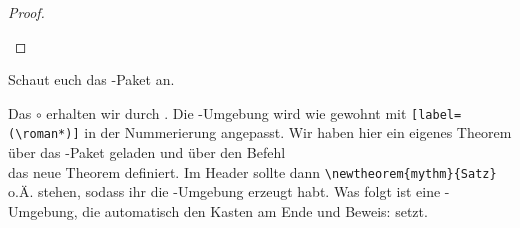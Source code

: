 \begin{enumerate}
\begin{mathespecial}
\begin{proof}
\begin{enumerate}[label=(\roman*)]
                \end{enumerate}
                \end{proof}
                \begin{hinweis}
                    Schaut euch das -Paket an.
                \end{hinweis}
            \begin{loesung}
                Das $\circ$ erhalten wir durch . Die -Umgebung
                wird wie gewohnt mit \verb|[label=(\roman*)]| in der Nummerierung
                angepasst. Wir haben hier ein eigenes Theorem über das
                -Paket geladen und über den Befehl\\
                das neue Theorem definiert. Im Header sollte dann 
                \verb|\newtheorem{mythm}{Satz}| o.Ä. stehen, sodass ihr die
                -Umgebung erzeugt habt. Was folgt ist eine
                -Umgebung, die automatisch den Kasten am Ende und
                \glqq Beweis:\grqq{} setzt.
            \end{loesung} 
            \end{mathespecial}                             
    \end{enumerate}


